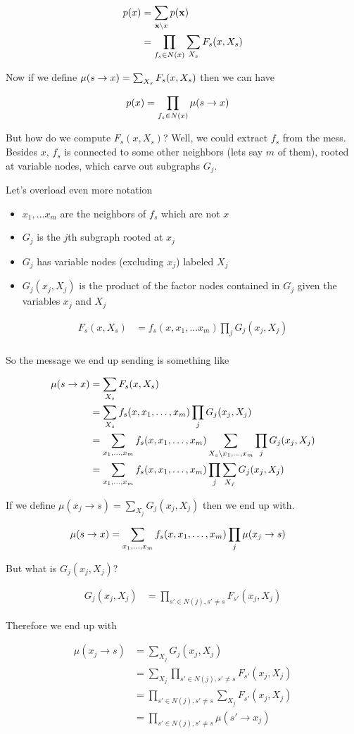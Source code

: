 \documentclass[12pt]{article}
\newcommand{\eq}[1]{\begin{align*}#1\end{align*}}
\newcommand{\itmz}[1]{\begin{itemize}#1\end{itemize}}
\begin{document}
\eq{
  p(x) &= \sum_{\x \setminus x} p(\x) \\
  &= \prod_{f_s \in N(x)} \sum_{X_s} F_s(x, X_s) \\
}

Now if we define $\mu (s \rightarrow x) = \sum_{X_s} F_s(x, X_s)$ then we can have

\eq{
  p(x) &= \prod_{f_s \in N(x)} \msx
}
 
But how do we compute $F_s(x, X_s)$? Well, we could extract $f_s$ from the mess. Besides $x$, $f_s$ is connected to some other neighbors (lets say $m$ of them), rooted at variable nodes, which carve out subgraphs $G_j$. 

Let's overload even more notation
\itmz{
\item $x_1, ... x_m$ are the neighbors of $f_s$ which are not $x$
\item $G_j$ is the $j$th subgraph rooted at $x_j$
\item $G_j$ has variable nodes (excluding $x_j$) labeled $X_j$
\item $G_j(x_j, X_j)$ is the product of the factor nodes contained in $G_j$ given the variables $x_j$ and $X_j$
}

\eq{
  F_s(x, X_s) &= f_s(x, x_1, ... x_m) \prod_j G_j(x_j, X_j) \\
}

So the message we end up sending is something like

\newcommand{\xxm}{x, x_1, \ldots, x_m}
\newcommand{\xoxm}{x_1, \ldots, x_m}

\eq{
  \msx &= \sum_{X_s} F_s(x, X_s) \\
  &= \sum_{X_s} f_s(\xxm) \prod_j G_j(x_j, X_j) \\
  &= \sum_{\xoxm} f_s(\xxm) \sum_{X_s \setminus \xoxm} \prod_j G_j(x_j, X_j) \\
  &= \sum_{\xoxm} f_s(\xxm) \prod_j \sum_{X_j} G_j(x_j, X_j) \\
}

If we define $\mu(x_j \rightarrow s) = \sum_{X_j} G_j(x_j, X_j)$ then we end up with.

\eq{
  \msx &= \sum_{\xoxm} f_s(\xxm) \prod_j \mu(x_j \rightarrow s)
}

But what is $G_j(x_j, X_j)$?

\eq{
  G_j(x_j, X_j) &= \prod_{s' \in N(j), s' \neq s} F_{s'}(x_j, X_j)
}

Therefore we end up with

\eq{
  \mu(x_j \rightarrow s) &= \sum_{X_j} G_j(x_j, X_j) \\
  &= \sum_{X_j} \prod_{s' \in N(j), s' \neq s} F_{s'}(x_j, X_j) \\
  &= \prod_{s' \in N(j), s' \neq s} \sum_{X_j} F_{s'}(x_j, X_j) \\
  &= \prod_{s' \in N(j), s' \neq s} \mu(s' \rightarrow x_j)
}
\end{document}
